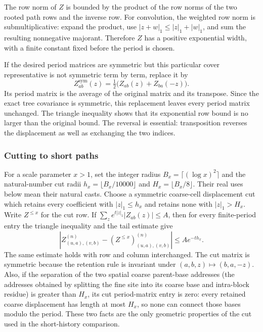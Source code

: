 The row norm of $Z$ is bounded by the product of the row norms of the two
rooted path rows and the inverse row. For convolution, the weighted row
norm is submultiplicative: expand the product, use
$|z+w|_1\le |z|_1+|w|_1$, and sum the resulting nonnegative majorant.
Therefore $Z$ has a positive exponential width, with a finite constant
fixed before the period is chosen.

If the desired period matrices are symmetric but this particular cover
representative is not symmetric term by term, replace it by
\[
 Z^{\mathrm{sym}}_{ab}(z)
 =\tfrac12\bigl(Z_{ab}(z)+Z_{ba}(-z)\bigr).
\]
Its period matrix is the average of the original matrix and its transpose.
Since the exact tree covariance is symmetric, this replacement leaves every
period matrix unchanged. The triangle inequality shows that its exponential
row bound is no larger than the original bound. The reversal is essential:
transposition reverses the displacement as well as exchanging the two
indices.

\subsubsection{Cutting to short paths}

For a scale parameter $x>1$, set the integer radius
$B_x=\lceil(\log x)^2\rceil$ and the natural-number cut radii
$h_x=\lfloor B_x/10000\rfloor$ and $H_x=\lfloor B_x/8\rfloor$.
Their real uses below mean their natural casts. Choose a symmetric
coarse-cell displacement cut which retains every coefficient with
$|z|_1\le h_x$ and retains none with $|z|_1>H_x$. Write $Z^{\le x}$ for
the cut row. If
$\sum_z e^{t|z|_1}|Z_{ab}(z)|\le A$, then for every finite-period entry the triangle inequality and the tail
estimate give
\[
 \left|Z^{(n)}_{(u,a),(v,b)}
       -(Z^{\le x})^{(n)}_{(u,a),(v,b)}\right|
 \le A e^{-t h_x}.
\]
The same estimate holds with row and column interchanged. The cut matrix
is symmetric because the retention rule is invariant under
$(a,b,z)\mapsto(b,a,-z)$. Also, if the separation of the two spatial
coarse parent-base addresses (the addresses obtained by splitting the fine
site into its coarse base and intra-block residue) is greater than $H_x$,
its cut period-matrix entry is zero: every retained coarse displacement
has length at most $H_x$, so none can connect those bases modulo the period. These two facts are the only geometric
properties of the cut used in the short-history comparison.

